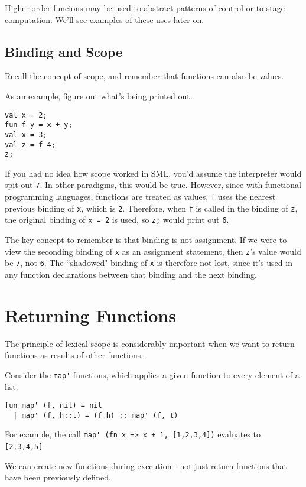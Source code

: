 \documentclass[11pt]{article}
\begin{document}
Higher-order funcions may be used to abstract patterns of control or to stage computation. We'll see examples of these uses later on.

\subsection{Binding and Scope}

Recall the concept of scope, and remember that functions can also be values.

As an example, figure out what's being printed out:

\begin{verbatim}
val x = 2;
fun f y = x + y;
val x = 3;
val z = f 4;
z;
\end{verbatim}

If you had no idea how scope worked in SML, you'd assume the interpreter would spit out \verb~7~. In other paradigms, this would be true. However, since with functional programming languages, functions are treated as values, \verb~f~ uses the nearest previous binding of \verb~x~, which is \verb~2~. Therefore, when \verb~f~ is called in the binding of \verb~z~, the original binding of \verb~x = 2~ is used, so \verb~z;~ would print out \verb~6~.

The key concept to remember is that binding is not assignment. If we were to view the seconding binding of \verb~x~ as an assignment statement, then \verb~z~'s value would be \verb~7~, not \verb~6~. The ``shadowed" binding of \verb~x~ is therefore not lost, since it's used in any function declarations between that binding and the next binding.

\section{Returning Functions}

The principle of lexical scope is considerably important when we want to return functions as results of other functions.

Consider the \verb~map'~ functions, which applies a given function to every element of a list. 

\begin{verbatim}
fun map' (f, nil) = nil
  | map' (f, h::t) = (f h) :: map' (f, t)
\end{verbatim}

For example, the call \verb~map' (fn x => x + 1, [1,2,3,4])~ evaluates to \verb~[2,3,4,5]~.

We can create new functions during execution - not just return functions that have been previously defined. 
\end{document}
